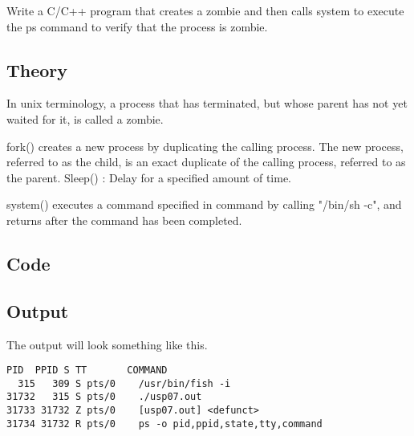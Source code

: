 Write a C/C++ program that creates a zombie and then calls system to execute the ps command to verify that the process is zombie.

\subsection{Theory}

In unix terminology, a process that has terminated, but whose parent has not yet waited for it, is called a zombie.

fork() creates a new process by duplicating the calling process. The new process, referred to as the child, is an exact duplicate of the calling process, referred to as the parent. Sleep() : Delay for a specified amount of time.

system() executes a command specified in command by calling "/bin/sh -c", and returns after the command has been completed.

\subsection{Code}



\subsection{Output}

The output will look something like this.

\begin{lstlisting}[style=shell-output]
  PID  PPID S TT       COMMAND
  315   309 S pts/0    /usr/bin/fish -i
31732   315 S pts/0    ./usp07.out
31733 31732 Z pts/0    [usp07.out] <defunct>
31734 31732 R pts/0    ps -o pid,ppid,state,tty,command
\end{lstlisting}
